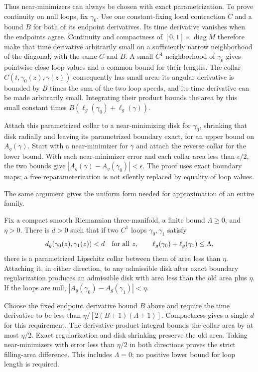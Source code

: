 Thus near-minimizers can always be chosen with exact parametrization.
To prove continuity on null loops, fix $\gamma_0$. Use one constant-fixing local
contraction $C$ and a bound $B$ for both of its endpoint derivatives.
Its time derivative vanishes when the endpoints agree. Continuity and
compactness of $[0,1]\times\operatorname{diag}M$ therefore make that
time derivative arbitrarily small on a sufficiently narrow neighborhood
of the diagonal, with the same $C$ and $B$. A small $C^1$ neighborhood
of $\gamma_0$ gives pointwise close loop values and a common bound for
their lengths. The collar
$C(t,\gamma_0(z),\gamma(z))$ consequently has small area: its angular
derivative is bounded by $B$ times the sum of the two loop speeds,
and its time derivative can be made arbitrarily small. Integrating
their product bounds the area by this small constant times
$B(\ell_g(\gamma_0)+\ell_g(\gamma))$.

Attach this parametrized collar to a near-minimizing disk for
$\gamma_0$, shrinking that disk radially and leaving its parametrized
boundary exact, for an upper bound on $A_g(\gamma)$. Start with a
near-minimizer for $\gamma$ and attach the reverse collar for the lower
bound. With each near-minimizer error and each collar area less than
$\epsilon/2$, the two bounds give
$|A_g(\gamma)-A_g(\gamma_0)|<\epsilon$. The proof uses exact boundary maps; a free
reparameterization is not silently replaced by equality of loop values.

The same argument gives the uniform form needed for approximation of
an entire family.
\begin{proposition}
\label{prop:filling-uniform-collars}
Fix a compact smooth Riemannian three-manifold, a finite bound
$\Lambda\geq0$, and $\eta>0$. There is $d>0$ such that if two
$C^1$ loops $\gamma_0,\gamma_1$ satisfy
\[
 d_g(\gamma_0(z),\gamma_1(z))<d\quad\hbox{for all }z,\qquad
 \ell_g(\gamma_0)+\ell_g(\gamma_1)\leq\Lambda,
\]
there is a parametrized Lipschitz collar between them of area less
than $\eta$. Attaching it, in either direction, to any admissible
disk after exact boundary regularization produces an admissible disk
with area less than the old area plus $\eta$. If the loops are null,
$|A_g(\gamma_0)-A_g(\gamma_1)|<\eta$.
\end{proposition}

Choose the fixed endpoint derivative bound $B$ above and require the
time derivative to be less than
$\eta/[2(B+1)(\Lambda+1)]$. Compactness gives a single $d$ for this
requirement. The derivative-product integral bounds the collar area
by at most $\eta/2$. Exact regularization and disk shrinking preserve
the old area. Taking near-minimizers with error less than $\eta/2$
in both directions proves the strict filling-area difference.
This includes $\Lambda=0$; no positive lower bound for loop length
is required.

